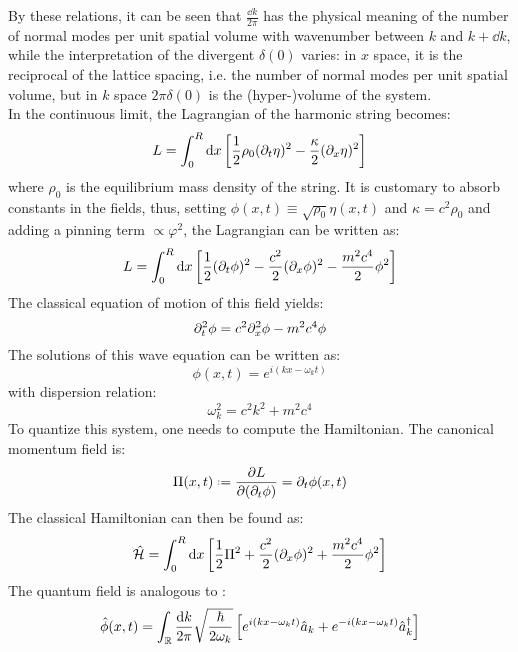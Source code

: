 By these relations, it can be seen that $ \frac{\dd k}{2\pi} $ has the physical meaning of the number of normal modes per unit spatial volume with wavenumber between $ k $ and $ k + \dd k $, while the interpretation of the divergent $ \delta(0) $ varies: in $ x $ space, it is the reciprocal of the lattice spacing, i.e. the number of normal modes per unit spatial volume, but in $ k $ space $ 2\pi \delta(0) $ is the (hyper-)volume of the system.\\
In the continuous limit, the Lagrangian of the harmonic string becomes:
\begin{equation*}
  L = \int_0^R \mathrm{d} x \left[ \frac{1}{2} \rho_0 (\partial_t \eta)^2 - \frac{\kappa}{2} (\partial_x \eta)^2 \right]
\end{equation*}
where $ \rho_0 $ is the equilibrium mass density of the string. It is customary to absorb constants in the fields, thus, setting $ \phi(x,t) \equiv \sqrt{\rho_0} \eta(x,t) $ and $ \kappa = c^2 \rho_0 $ and adding a pinning term $ \propto \varphi^2 $, the Lagrangian can be written as:
\begin{equation}
  L = \int_0^R \mathrm{d} x \left[ \frac{1}{2} (\partial_t \phi)^2 - \frac{c^2}{2} (\partial_x \phi)^2 - \frac{m^2 c^4}{2} \phi^2 \right]
\end{equation}
The classical equation of motion of this field yields:
\begin{equation}
  \partial_t^2 \phi = c^2 \partial_x^2 \phi - m^2 c^4 \phi
\end{equation}
The solutions of this wave equation can be written as:
\begin{equation}
  \phi(x,t) = e^{i \left( kx - \omega_k t \right)}
\end{equation}
with dispersion relation:
\begin{equation}
  \omega_k^2 = c^2 k^2 + m^2 c^4
\end{equation}
To quantize this system, one needs to compute the Hamiltonian. The canonical momentum field is:
\begin{equation}
  \Pi(x,t) \defeq \frac{\pa L}{\pa (\pa_t \phi)} = \pa_t \phi(x,t)
\end{equation}
The classical Hamiltonian can then be found as:
\begin{equation}
  \hat{\mathcal{H}} = \int_0^R \mathrm{d} x \left[ \frac{1}{2} \Pi^2 + \frac{c^2}{2} (\partial_x \phi)^2 + \frac{m^2 c^4}{2} \phi^2 \right]
\end{equation}
The quantum field is analogous to :
\begin{equation}
  \hat\phi(x,t) = \int_{\mathbb{R}} \frac{\mathrm{d} k}{2\pi} \sqrt{\frac{\hbar}{2\omega_k}} \left[ e^{i \left( kx - \omega_k t \right)} \hat{a}_k + e^{-i \left( kx - \omega_k t \right)} \hat{a}_k^\dagger \right]
\end{equation}
